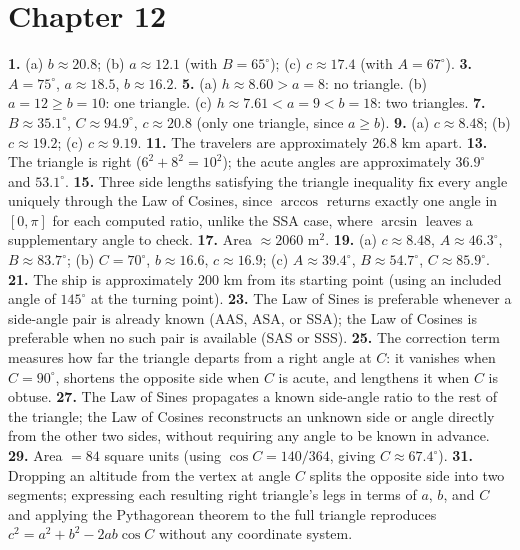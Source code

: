 \section*{Chapter 12}
\textbf{1.} (a) $b \approx 20.8$; (b) $a \approx 12.1$ (with $B=65^\circ$);
(c) $c \approx 17.4$ (with $A=67^\circ$). \quad
\textbf{3.} $A=75^\circ$, $a \approx 18.5$, $b \approx 16.2$. \quad
\textbf{5.} (a) $h \approx 8.60 > a=8$: no triangle. (b) $a=12 \geq
b=10$: one triangle. (c) $h \approx 7.61 < a=9 < b=18$: two triangles.
\quad
\textbf{7.} $B \approx 35.1^\circ$, $C \approx 94.9^\circ$, $c \approx
20.8$ (only one triangle, since $a \geq b$). \quad
\textbf{9.} (a) $c \approx 8.48$; (b) $c \approx 19.2$; (c) $c \approx
9.19$. \quad
\textbf{11.} The travelers are approximately $26.8$ km apart. \quad
\textbf{13.} The triangle is right ($6^2+8^2=10^2$); the acute angles
are approximately $36.9^\circ$ and $53.1^\circ$. \quad
\textbf{15.} Three side lengths satisfying the triangle inequality fix
every angle uniquely through the Law of Cosines, since $\arccos$ returns
exactly one angle in $[0,\pi]$ for each computed ratio, unlike the SSA
case, where $\arcsin$ leaves a supplementary angle to check. \quad
\textbf{17.} Area $\approx 2060$ m$^2$. \quad
\textbf{19.} (a) $c \approx 8.48$, $A \approx 46.3^\circ$, $B \approx
83.7^\circ$; (b) $C=70^\circ$, $b \approx 16.6$, $c \approx 16.9$; (c)
$A \approx 39.4^\circ$, $B \approx 54.7^\circ$, $C \approx 85.9^\circ$.
\quad
\textbf{21.} The ship is approximately $200$ km from its starting point
(using an included angle of $145^\circ$ at the turning point). \quad
\textbf{23.} The Law of Sines is preferable whenever a side-angle pair is
already known (AAS, ASA, or SSA); the Law of Cosines is preferable when
no such pair is available (SAS or SSS). \quad
\textbf{25.} The correction term measures how far the triangle departs
from a right angle at $C$: it vanishes when $C=90^\circ$, shortens the
opposite side when $C$ is acute, and lengthens it when $C$ is obtuse.
\quad
\textbf{27.} The Law of Sines propagates a known side-angle ratio to the
rest of the triangle; the Law of Cosines reconstructs an unknown side or
angle directly from the other two sides, without requiring any angle to
be known in advance. \quad
\textbf{29.} Area $=84$ square units (using $\cos C = 140/364$, giving
$C \approx 67.4^\circ$). \quad
\textbf{31.} Dropping an altitude from the vertex at angle $C$ splits the
opposite side into two segments; expressing each resulting right
triangle's legs in terms of $a$, $b$, and $C$ and applying the
Pythagorean theorem to the full triangle reproduces $c^2 = a^2+b^2-2ab\cos
C$ without any coordinate system.

